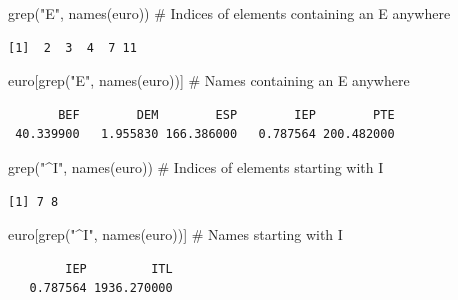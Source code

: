 \documentclass[
  letterpaper,
  DIV=11,
  numbers=noendperiod]{scrreprt}
\newenvironment{Shaded}{\begin{snugshade}}{\end{snugshade}}
\newcommand{\CommentTok}[1]{\textcolor[rgb]{0.37,0.37,0.37}{#1}}
\newcommand{\FunctionTok}[1]{\textcolor[rgb]{0.28,0.35,0.67}{#1}}
\newcommand{\NormalTok}[1]{\textcolor[rgb]{0.00,0.23,0.31}{#1}}
\newcommand{\StringTok}[1]{\textcolor[rgb]{0.13,0.47,0.30}{#1}}
\begin{document}
\begin{Shaded}
\begin{Highlighting}[]
\FunctionTok{grep}\NormalTok{(}\StringTok{"E"}\NormalTok{, }\FunctionTok{names}\NormalTok{(euro)) }\CommentTok{\# Indices of elements containing an E anywhere}
\end{Highlighting}
\end{Shaded}

\begin{verbatim}
[1]  2  3  4  7 11
\end{verbatim}

\begin{Shaded}
\begin{Highlighting}[]
\NormalTok{euro[}\FunctionTok{grep}\NormalTok{(}\StringTok{"E"}\NormalTok{, }\FunctionTok{names}\NormalTok{(euro))] }\CommentTok{\# Names containing an E anywhere}
\end{Highlighting}
\end{Shaded}

\begin{verbatim}
       BEF        DEM        ESP        IEP        PTE 
 40.339900   1.955830 166.386000   0.787564 200.482000 
\end{verbatim}

\begin{Shaded}
\begin{Highlighting}[]
\FunctionTok{grep}\NormalTok{(}\StringTok{"\^{}I"}\NormalTok{, }\FunctionTok{names}\NormalTok{(euro)) }\CommentTok{\# Indices of elements starting with I}
\end{Highlighting}
\end{Shaded}

\begin{verbatim}
[1] 7 8
\end{verbatim}

\begin{Shaded}
\begin{Highlighting}[]
\NormalTok{euro[}\FunctionTok{grep}\NormalTok{(}\StringTok{"\^{}I"}\NormalTok{, }\FunctionTok{names}\NormalTok{(euro))] }\CommentTok{\# Names starting with I}
\end{Highlighting}
\end{Shaded}

\begin{verbatim}
        IEP         ITL 
   0.787564 1936.270000 
\end{verbatim}

\begin{Shaded}
\end{Shaded}
\end{document}
